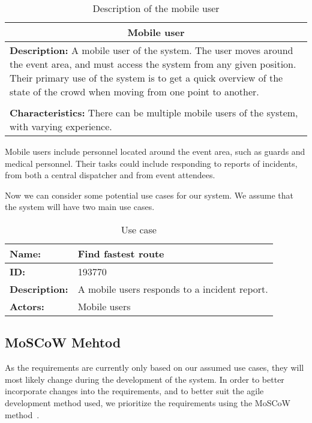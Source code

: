 \begin{table}[h!]
    \centering
    \begin{tabularx}{/8}{X}
        \toprule
        \multicolumn{1}{c}{\textbf{Mobile user}} \\ 
        \midrule
        \textbf{Description:} A mobile user of the system. The user moves around the event area, and must access the system from any given position. Their primary use of the system is to get a quick overview of the state of the crowd when moving from one point to another. \\
        \\
        \textbf{Characteristics:} There can be multiple mobile users of the system, with varying experience. \\
        \bottomrule
    \end{tabularx}
    \caption{Description of the mobile user}
    \label{tab:mob_user}
\end{table}

Mobile users include personnel located around the event area, such as guards and medical personnel. Their tasks could include responding to reports of incidents, from both a central dispatcher and from event attendees.

Now we can consider some potential use cases for our system. We assume that the system will have two main use cases. 

\begin{table}[h!]
    \centering
    \begin{tabularx}{\textwidth}{|l|X|}
        \hline
        \textbf{Name:}  & Find fastest route \\ \hline
        \textbf{ID:}    & 193770 \\ \hline
        \textbf{Description:} & A mobile users responds to a incident report. \\ \hline
        \textbf{Actors:} & Mobile users \\
        \hline
    \end{tabularx}
    \caption{Use case}
    \label{tab:s1_uc1}
\end{table}


\subsection{MoSCoW Mehtod}
As the requirements are currently only based on our assumed use cases, they will most likely change during the development of the system. In order to better incorporate changes into the requirements, and to better suit the agile development method used, we prioritize the requirements using the MoSCoW method~\cite{moscow}.

